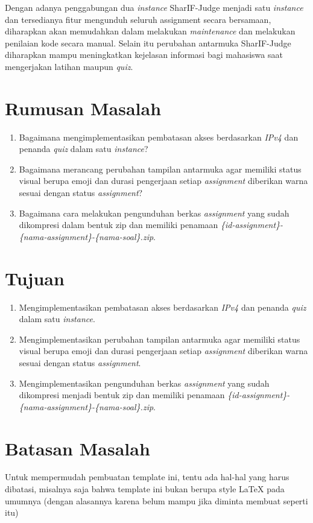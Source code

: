 Dengan adanya penggabungan dua \textit{instance} SharIF-Judge menjadi satu \textit{instance} dan tersedianya fitur mengunduh seluruh assignment secara bersamaan, diharapkan akan memudahkan dalam melakukan \textit{maintenance} dan melakukan penilaian kode secara manual. Selain itu perubahan antarmuka SharIF-Judge diharapkan mampu meningkatkan kejelasan informasi bagi mahasiswa saat mengerjakan latihan maupun \textit{quiz}.


\section{Rumusan Masalah}
\label{sec:rumusan}
\begin{enumerate}
     \item Bagaimana mengimplementasikan pembatasan akses berdasarkan \textit{IPv4} dan penanda \textit{quiz} dalam satu \textit{instance}?
     \item Bagaimana merancang perubahan tampilan antarmuka agar memiliki status visual berupa emoji dan durasi pengerjaan setiap \textit{assignment} diberikan warna sesuai dengan status \textit{assignment}?
     \item Bagaimana cara melakukan pengunduhan berkas \textit{assignment} yang sudah dikompresi dalam bentuk zip dan memiliki penamaan \textit{\{id-assignment\}-\{nama-assignment\}-\{nama-soal\}.zip}.
\end{enumerate}

\section{Tujuan}
\label{sec:tujuan}
\begin{enumerate}
     \item Mengimplementasikan pembatasan akses berdasarkan \textit{IPv4} dan penanda \textit{quiz} dalam satu \textit{instance}.
     \item Mengimplementasikan perubahan tampilan antarmuka agar memiliki status visual berupa emoji dan durasi pengerjaan setiap \textit{assignment} diberikan warna sesuai dengan status \textit{assignment}.
     \item Mengimplementasikan pengunduhan berkas \textit{assignment} yang sudah dikompresi menjadi bentuk zip dan memiliki penamaan \textit{\{id-assignment\}-\{nama-assignment\}-\{nama-soal\}.zip}.
\end{enumerate}


\section{Batasan Masalah}
\label{sec:batasan}
Untuk mempermudah pembuatan template ini, tentu ada hal-hal yang harus dibatasi, misalnya saja bahwa template ini bukan berupa style \LaTeX{} pada umumnya (dengan alasannya karena belum mampu jika diminta membuat seperti itu)

